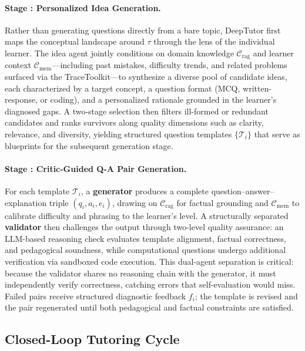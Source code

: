 \paragraph{Stage : Personalized Idea Generation.}
Rather than generating questions directly from a bare topic, DeepTutor first maps the conceptual landscape around $\tau$ through the lens of the individual learner.
The idea agent jointly conditions on domain knowledge $\mathcal{C}_{\text{rag}}$ and learner context $\mathcal{C}_{\text{mem}}$---including past mistakes, difficulty trends, and related problems surfaced via the TraceToolkit---to synthesize a diverse pool of candidate ideas, each characterized by a target concept, a question format (MCQ, written-response, or coding), and a personalized rationale grounded in the learner's diagnosed gaps.
A two-stage selection then filters ill-formed or redundant candidates and ranks survivors along quality dimensions such as clarity, relevance, and diversity, yielding structured question templates $\{\mathcal{T}_i\}$ that serve as blueprints for the subsequent generation stage.

\paragraph{Stage : Critic-Guided Q-A Pair Generation.}
For each template $\mathcal{T}_i$, a \textbf{generator} produces a complete question--answer--explanation triple $(q_i, a_i, e_i)$, drawing on $\mathcal{C}_{\text{rag}}$ for factual grounding and $\mathcal{C}_{\text{mem}}$ to calibrate difficulty and phrasing to the learner's level.
A structurally separated \textbf{validator} then challenges the output through two-level quality assurance: an LLM-based reasoning check evaluates template alignment, factual correctness, and pedagogical soundness, while computational questions undergo additional verification via sandboxed code execution.
This dual-agent separation is critical: because the validator shares no reasoning chain with the generator, it must independently verify correctness, catching errors that self-evaluation would miss.
Failed pairs receive structured diagnostic feedback $f_i$; the template is revised and the pair regenerated until both pedagogical and factual constraints are satisfied.

\subsection{Closed-Loop Tutoring Cycle}
\label{sec:system}


